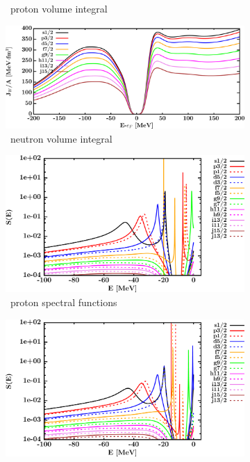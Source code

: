 \begin{figure}[hbtp]
\begin{subfigure}[b]{0.45\textwidth}
        \caption{\niFour\ proton volume integral}
        \label{DOMFitData_ni64_proton_potentialIntegral}
    \end{subfigure}\hspace{6pt}
    \begin{subfigure}[b]{0.45\textwidth}
        \centering
        \includegraphics[width=\linewidth]{figures/ni64_neutronVolumeIntegrals.png}
        \caption{\niFour\ neutron volume integral}
        \label{DOMFitData_ni64_neutron_potentialIntegral}
    \end{subfigure}\vspace{0.3in}
    \begin{subfigure}[b]{0.45\textwidth}
        \centering
        \includegraphics[width=\linewidth]{figures/ni64_protonSpectralFunctions.png}
        \caption{\niFour\ proton spectral functions}
        \label{DOMFitData_ni64_proton_spectralFunctions}
    \end{subfigure}\hspace{6pt}
    \begin{subfigure}[b]{0.45\textwidth}
        \centering
        \includegraphics[width=\linewidth]{figures/ni64_neutronSpectralFunctions.png}

\end{subfigure}
\end{figure}

